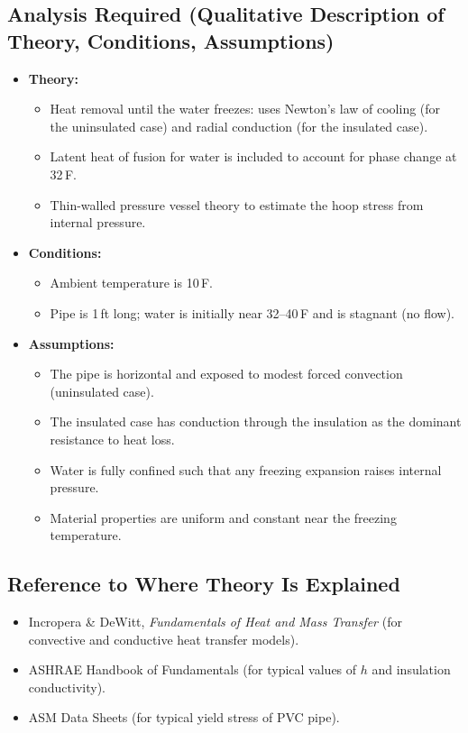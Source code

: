 \documentclass[12pt]{article}
\begin{document}
\subsection*{Analysis Required (Qualitative Description of Theory, Conditions, Assumptions)}
\begin{itemize}
    \item \textbf{Theory:} 
    \begin{itemize}
        \item Heat removal until the water freezes: uses Newton's law of cooling (for the uninsulated case) and radial conduction (for the insulated case).
        \item Latent heat of fusion for water is included to account for phase change at 32\,\textdegree F.
        \item Thin-walled pressure vessel theory to estimate the hoop stress from internal pressure.
    \end{itemize}
    \item \textbf{Conditions:}
    \begin{itemize}
        \item Ambient temperature is 10\,\textdegree F.
        \item Pipe is 1\,ft long; water is initially near 32--40\,\textdegree F and is stagnant (no flow).
    \end{itemize}
    \item \textbf{Assumptions:}
    \begin{itemize}
        \item The pipe is horizontal and exposed to modest forced convection (uninsulated case).
        \item The insulated case has conduction through the insulation as the dominant resistance to heat loss.
        \item Water is fully confined such that any freezing expansion raises internal pressure.
        \item Material properties are uniform and constant near the freezing temperature.
    \end{itemize}
\end{itemize}

\subsection*{Reference to Where Theory Is Explained}
\begin{itemize}
    \item Incropera \& DeWitt, \emph{Fundamentals of Heat and Mass Transfer} (for convective and conductive heat transfer models).
    \item ASHRAE Handbook of Fundamentals (for typical values of $h$ and insulation conductivity).
    \item ASM Data Sheets (for typical yield stress of PVC pipe).
\end{itemize}
\end{document}

